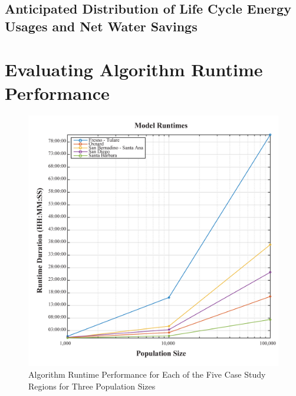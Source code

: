     \subsection{Anticipated Distribution of Life Cycle Energy Usages and Net Water Savings}
        
\section{Evaluating Algorithm Runtime Performance}

    \begin{figure}[!h]
        \begin{center}
        \includegraphics[width=5.5in]{figures/Runtimes.png}
        \caption{Algorithm Runtime Performance for Each of the Five Case Study Regions for Three Population Sizes}
        \label{fig:Runtimes}
        \end{center}
    \end{figure}
    

